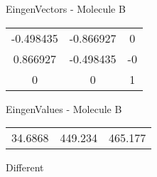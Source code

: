 \begin{multicols}{2}
\begin{center}
\vtab
 EingenVectors - Molecule B     \\
\vtab
\begin{tabular}{|c c c|}
-0.498435	 & 	-0.866927	 & 	0	 \\
0.866927	 & 	-0.498435	 & 	-0	 \\
0	 & 	0	 & 	1
\end{tabular}

\vtab
 EingenValues - Molecule B     \\
\vtab
\begin{tabular}{|c c c|}
34.6868	 & 	449.234	 & 	465.177	 \\
\end{tabular}

\end{center}
\end{multicols}
\begin{center}
\vtab
\vtab
\textcolor{NavyBlue}{\Large Different}
\end{center}

 \newpage

